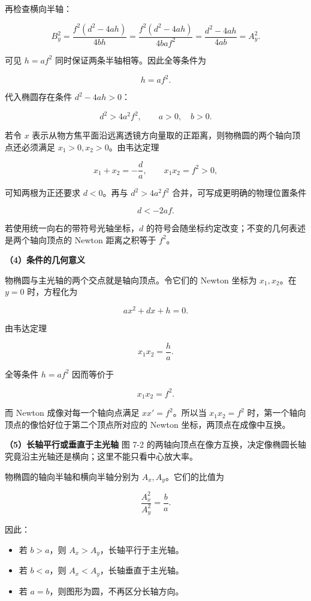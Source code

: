 \documentclass[12pt,a4paper,UTF8]{ctexart}
\newcommand{\tightlist}{\setlength{\itemsep}{0pt}\setlength{\parskip}{0pt}}
\begin{document}
再检查横向半轴：

\[B_y^2
=\frac{f^2(d^2-4ah)}{4bh}
=\frac{f^2(d^2-4ah)}{4baf^2}
=\frac{d^2-4ah}{4ab}
=A_y^2.\]

可见 \(h=af^2\) 同时保证两条半轴相等。因此全等条件为

\[\boxed{h=af^2}.\]

代入椭圆存在条件 \(d^2-4ah>0\)：

\[\boxed{d^2>4a^2f^2},\qquad a>0,\quad b>0.\]

若令 \(x\)
表示从物方焦平面沿远离透镜方向量取的正距离，则物椭圆的两个轴向顶点还必须满足
\(x_1>0,x_2>0\)。由韦达定理

\[x_1+x_2=-\frac da,\qquad x_1x_2=f^2>0,\]

可知两根为正还要求 \(d<0\)。再与 \(d^2>4a^2f^2\)
合并，可写成更明确的物理位置条件

\[\boxed{d<-2af}.\]

若使用统一向右的带符号光轴坐标，\(d\)
的符号会随坐标约定改变；不变的几何表述是两个轴向顶点的 Newton
距离之积等于 \(f^2\)。

\textbf{（4）条件的几何意义}

物椭圆与主光轴的两个交点就是轴向顶点。令它们的 Newton 坐标为
\(x_1,x_2\)。在 \(y=0\) 时，方程化为

\[ax^2+dx+h=0.\]

由韦达定理

\[x_1x_2=\frac ha.\]

全等条件 \(h=af^2\) 因而等价于

\[\boxed{x_1x_2=f^2}.\]

而 Newton 成像对每一个轴向点满足 \(xx'=f^2\)。所以当 \(x_1x_2=f^2\)
时，第一个轴向顶点的像恰好位于第二个顶点所对应的 Newton
坐标，两顶点在成像中互换。

\textbf{（5）长轴平行或垂直于主光轴} 图 7-2
的两轴向顶点在像方互换，决定像椭圆长轴究竟沿主光轴还是横向；这里不能只看中心放大率。

物椭圆的轴向半轴和横向半轴分别为 \(A_x,A_y\)。它们的比值为

\[\frac{A_x^2}{A_y^2}=\frac ba.\]

因此：

\begin{itemize}
\tightlist
\item
  若 \(b>a\)，则 \(A_x>A_y\)，长轴平行于主光轴。
\item
  若 \(b<a\)，则 \(A_x<A_y\)，长轴垂直于主光轴。
\item
  若 \(a=b\)，则图形为圆，不再区分长轴方向。
\end{itemize}
\end{document}
